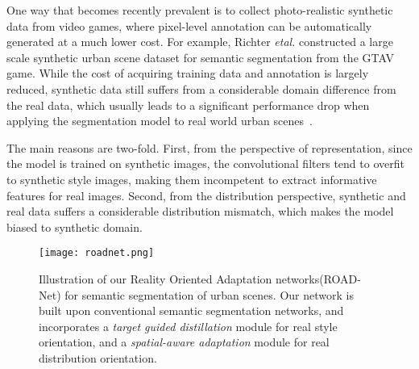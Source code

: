 \documentclass[10pt,twocolumn,letterpaper]{article}
\begin{document}
One way that becomes recently prevalent is to collect photo-realistic synthetic data from video games, where pixel-level annotation can be automatically generated at a much lower cost. For example, Richter \textit{etal.}\cite{richter2016playing} constructed a large scale synthetic urban scene dataset for semantic segmentation from the GTAV game. While the cost of acquiring training data and annotation is largely reduced, synthetic data still suffers from a considerable domain difference from the real data, which usually leads to a significant performance drop when applying the segmentation model to real world urban scenes~\cite{hoffman2016fcns,zhang2017curriculum}. 

The main reasons are two-fold. First, from the perspective of representation, since the model is trained on synthetic images, the convolutional filters tend to overfit to synthetic style images, making them incompetent to extract informative features for real images. Second, from the distribution perspective, synthetic and real data suffers a considerable distribution mismatch, which makes the model biased to synthetic domain.  

\begin{figure*}
\label{fig:roadnet}
\centering
\texttt{[image: roadnet.png]}
\caption{Illustration of our Reality Oriented Adaptation networks(ROAD-Net) for semantic segmentation of urban scenes. Our network is built upon conventional semantic segmentation networks, and incorporates a \textit{target guided distillation} module for real style orientation, and a \textit{spatial-aware adaptation} module for real distribution orientation.}
\end{figure*}
    
\end{document}
